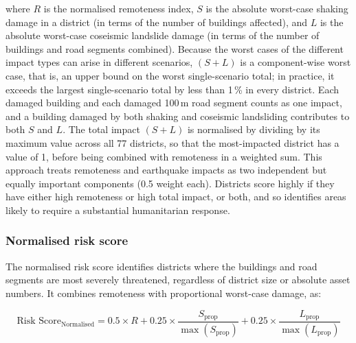 \documentclass[nhess, manuscript]{copernicus}
\begin{document}
where $R$ is the normalised remoteness index, $S$ is the absolute worst-case shaking damage in a district (in terms of the number of buildings affected), and $L$ is the absolute worst-case coseismic landslide damage (in terms of the number of buildings and road segments combined). Because the worst cases of the different impact types can arise in different scenarios, $(S + L)$ is a component-wise worst case, that is, an upper bound on the worst single-scenario total; in practice, it exceeds the largest single-scenario total by less than 1\,\% in every district. Each damaged building and each damaged 100\,\unit{m} road segment counts as one impact, and a building damaged by both shaking and coseismic landsliding contributes to both $S$ and $L$. The total impact $(S + L)$ is normalised by dividing by its maximum value across all 77 districts, so that the most-impacted district has a value of 1, before being combined with remoteness in a weighted sum. This approach treats remoteness and earthquake impacts as two independent but equally important components (0.5 weight each). Districts score highly if they have either high remoteness or high total impact, or both, and so identifies areas likely to require a substantial humanitarian response.

\subsubsection{Normalised risk score}

The normalised risk score identifies districts where the buildings and road segments are most severely threatened, regardless of district size or absolute asset numbers. It combines remoteness with proportional worst-case damage, as:

\begin{equation}
\label{eq:normalized-risk-score}
\text{Risk Score}_{\text{Normalised}} = 0.5 \times R + 0.25 \times \frac{S_{\text{prop}}}{\max(S_{\text{prop}})} + 0.25 \times \frac{L_{\text{prop}}}{\max(L_{\text{prop}})}
\end{equation}
\end{document}
